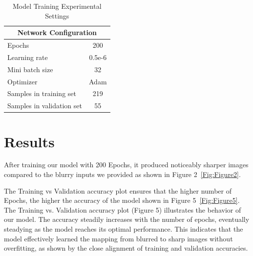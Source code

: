 \documentclass[conference]{IEEEtran}
\begin{document}
\begin{table}[!t]
\centering
\caption{Model Training Experimental Settings}
\label{tab:MTConfig} 
\begin{tabular}{|l|c|}
\hline
\multicolumn{2}{|c|}{\textbf{Network Configuration}} 
\\ \hline
Epochs & 200 \\
Learning rate & 0.5e-6 \\
Mini batch size & 32 \\ 
Optimizer & Adam \\
Samples in training set & 219 \\
Samples in validation set & 55 \\ \hline
\end{tabular}
\end{table}


\section{Results}
After training our model with 200 Epochs, it produced noticeably sharper images compared to the blurry inputs we provided as shown in Figure 2~\ref{Fig:Figure2}. 

The Training vs Validation accuracy plot ensures that the higher number of Epochs, the higher the accuracy of the model shown in Figure 5~\ref{Fig:Figure5}.
The Training vs. Validation accuracy plot (Figure 5) illustrates the  behavior of our model. 
The accuracy steadily increases with the number of epochs, eventually steadying as the model reaches its optimal performance.
This indicates that the model effectively learned the mapping from blurred to sharp images without overfitting, as shown by the close alignment of training and validation accuracies.
\end{document}
